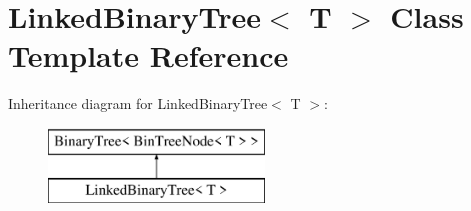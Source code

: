 \hypertarget{classLinkedBinaryTree}{}\section{Linked\+Binary\+Tree$<$ T $>$ Class Template Reference}
\label{classLinkedBinaryTree}
Inheritance diagram for Linked\+Binary\+Tree$<$ T $>$\+:\begin{figure}[H]
\begin{center}
\leavevmode
\includegraphics[height=2.000000cm]{classLinkedBinaryTree}
\end{center}
\end{figure}
